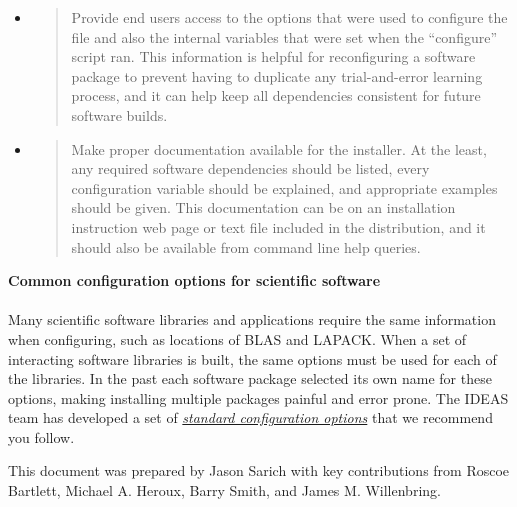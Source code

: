 \documentclass[]{article}
\begin{document}
\begin{itemize}
\item
  \begin{quote}
  Provide end users access to the options that were used to configure
  the file and also the internal variables that were set when the
  ``configure'' script ran. This information is helpful for
  reconfiguring a software package to prevent having to duplicate any
  trial-and-error learning process, and it can help keep all
  dependencies consistent for future software builds.
  \end{quote}
\item
  \begin{quote}
  Make proper documentation available for the installer. At the least,
  any required software dependencies should be listed, every
  configuration variable should be explained, and appropriate examples
  should be given. This documentation can be on an installation
  instruction web page or text file included in the distribution, and it
  should also be available from command line help queries.
  \end{quote}
\end{itemize}

\textbf{Common configuration options for scientific software\\
}\\
Many scientific software libraries and applications require the same
information when configuring, such as locations of BLAS and LAPACK. When
a set of interacting software libraries is built, the same options must
be used for each of the libraries. In the past each software package
selected its own name for these options, making installing multiple
packages painful and error prone. The IDEAS team has developed a set of
\href{https://drive.google.com/open?id=18028D6nsuhIrCvJnX6c07r8m_Np4SH-aGXMX4svMs1w}{\emph{standard
configuration options}} that we recommend you follow.

This document was prepared by Jason Sarich with key contributions from
Roscoe Bartlett, Michael A. Heroux, Barry Smith, and James M.
Willenbring.
\end{document}
